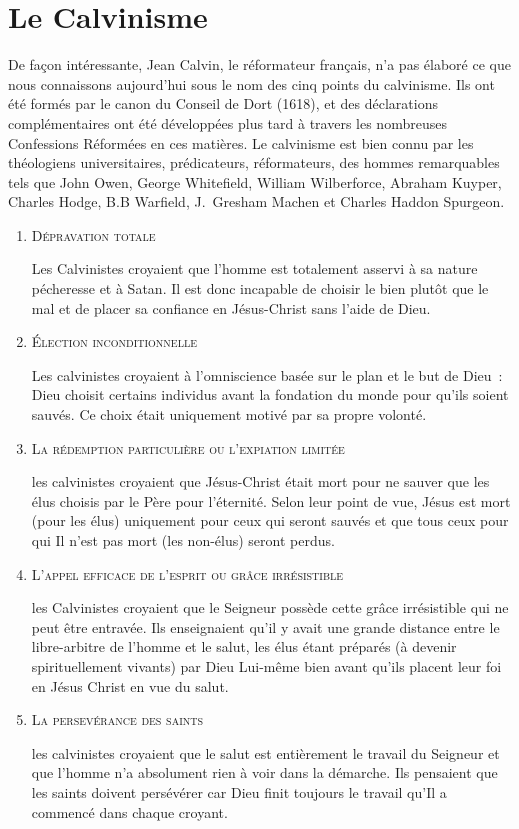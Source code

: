 \section{Le Calvinisme}

De façon intéressante, Jean Calvin, le réformateur français, n'a pas élaboré
 ce que nous connaissons aujourd'hui sous le nom des cinq points du calvinisme.
 Ils ont été formés par le canon du Conseil de Dort (1618), et des déclarations
 complémentaires ont été développées plus tard à travers les nombreuses
 Confessions Réformées en ces matières. Le calvinisme est bien connu
 par les théologiens universitaires, prédicateurs, réformateurs,
 des hommes  remarquables tels que John Owen, George Whitefield,
 William Wilberforce, Abraham Kuyper, Charles Hodge, B.B Warfield,
 J.~Gresham Machen et Charles Haddon Spurgeon.

\begin{enumerate}

  \item  \textsc{Dépravation totale}

Les Calvinistes croyaient que l'homme est totalement 
 asservi à sa nature pécheresse et à Satan.
 Il est donc incapable de choisir le bien plutôt que le mal
 et de placer sa confiance en Jésus-Christ sans l'aide de Dieu.

  \item  \textsc{Élection inconditionnelle}

Les calvinistes croyaient à l'omniscience basée sur le plan et le but de Dieu~:
 Dieu choisit certains individus avant la fondation du monde pour qu'ils soient sauvés.
 Ce choix était uniquement motivé par sa propre volonté.

  \item  \textsc{La rédemption particulière ou l'expiation limitée}

les calvinistes croyaient que Jésus-Christ était mort pour ne sauver que les élus choisis par le Père pour l'éternité. Selon leur point de vue, Jésus est mort (pour les élus) uniquement pour ceux qui seront sauvés et que tous ceux pour qui Il n'est pas mort (les non-élus) seront perdus.

  \item  \textsc{L'appel efficace de l'esprit ou grâce irrésistible}

les Calvinistes croyaient que le Seigneur possède cette grâce irrésistible qui ne peut être entravée. Ils enseignaient qu'il y avait une grande distance entre le libre-arbitre de l'homme et le salut, les élus étant préparés (à devenir spirituellement vivants) par Dieu Lui-même bien avant qu'ils  placent leur foi en Jésus Christ en vue du salut.

  \item  \textsc{La persevérance des saints}

les calvinistes croyaient que le salut est entièrement le travail du Seigneur et que l'homme n'a absolument rien à voir dans la démarche. Ils pensaient que les saints doivent persévérer car Dieu finit toujours le travail qu'Il a commencé dans chaque croyant.

\end{enumerate}

